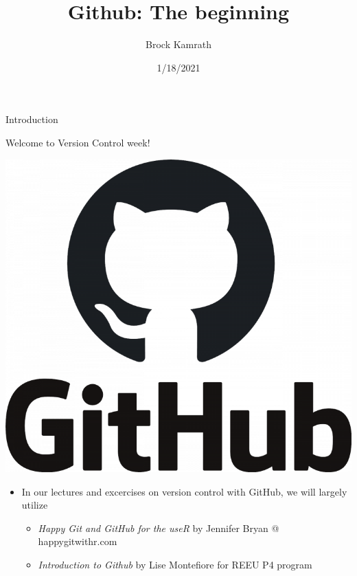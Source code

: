 \documentclass[
  ignorenonframetext,
]{beamer}
\title{Github: The beginning}
\author{Brock Kamrath}
\date{1/18/2021}
\providecommand{\tightlist}{%
  \setlength{\itemsep}{0pt}\setlength{\parskip}{0pt}}
\begin{document}
\frame{\titlepage}

\begin{frame}{Introduction}
\protect\hypertarget{introduction}{}

Welcome to Version Control week!

\includegraphics[width=10.67in]{pres_figs/github_logo2}

\begin{itemize}
\tightlist
\item
  In our lectures and excercises on version control with GitHub, we will
  largely utilize

  \begin{itemize}
  \tightlist
  \item
    \emph{Happy Git and GitHub for the useR} by Jennifer Bryan @
    happygitwithr.com
  \item
    \emph{Introduction to Github} by Lise Montefiore for REEU P4 program
  \end{itemize}
\end{itemize}

\end{frame}
\end{document}
